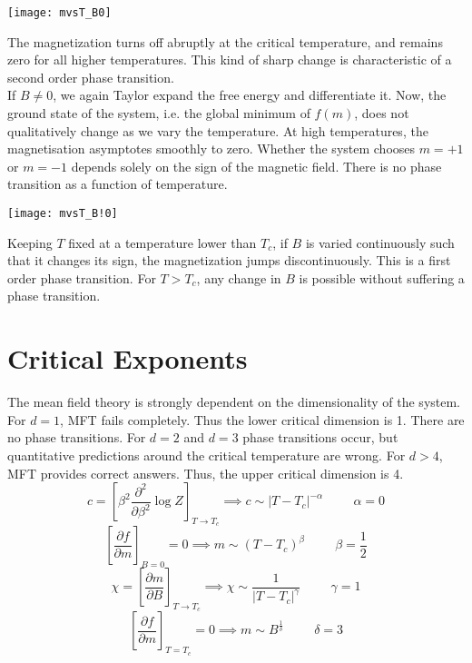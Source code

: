 \begin{center}
    \texttt{[image: mvsT\_B0]}
\end{center}

\noindent The magnetization turns off abruptly at the critical temperature, and remains zero for all higher temperatures. This kind of sharp change is characteristic of a second order phase transition.\\

\noindent If $B\neq 0$, we again Taylor expand the free energy and differentiate it. Now, the ground state of the system, i.e. the global minimum of $f(m)$, does not qualitatively change as we vary the temperature. At high temperatures, the magnetisation asymptotes smoothly to zero. Whether the system chooses $m=+1$ or $m=-1$ depends solely on the sign of the magnetic field. There is no phase transition as a function of temperature.

\begin{center}
    \texttt{[image: mvsT\_B!0]}
\end{center}

\noindent Keeping $T$ fixed at a temperature lower than $T_c$, if $B$ is varied continuously such that it changes its sign, the magnetization jumps discontinuously. This is a first order phase transition. For $T>T_c$, any change in $B$ is possible without suffering a phase transition.

\section{Critical Exponents}
The mean field theory is strongly dependent on the dimensionality of the system. For $d=1$, MFT fails completely. Thus the lower critical dimension is 1. There are no phase transitions. For $d=2$ and $d=3$ phase transitions occur, but quantitative predictions around the critical temperature are wrong. For $d>4$, MFT provides correct answers. Thus, the upper critical dimension is 4.\\

$$c=\left[\beta^2\frac{\partial^2}{\partial\beta^2}\log Z\right]_{T\rightarrow T_c}\implies c\sim|T-T_c|^{-\alpha}\hspace{1cm}\alpha=0$$
$$\left[\frac{\partial f}{\partial m}\right]_{B=0}=0\implies m\sim(T-T_c)^\beta\hspace{1cm}\beta=\frac{1}{2}$$
$$\chi=\left[\frac{\partial m}{\partial B}\right]_{T\rightarrow T_c}\implies\chi\sim\frac{1}{|T-T_c|^\gamma}\hspace{1cm}\gamma=1$$
$$\left[\frac{\partial f}{\partial m}\right]_{T=T_c}=0\implies m\sim B^\frac{1}{\delta}\hspace{1cm}\delta=3$$\\

